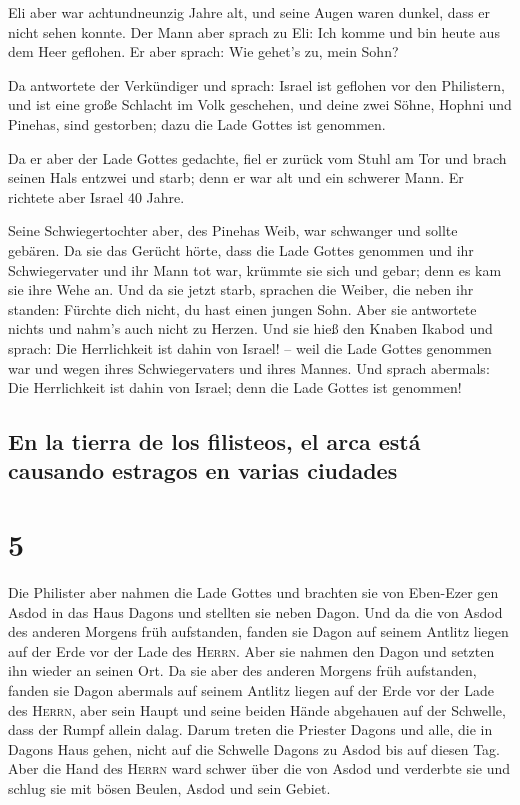  Eli aber war achtundneunzig Jahre alt, und seine Augen
waren dunkel, dass er nicht sehen konnte.  Der Mann aber
sprach zu Eli: Ich komme und bin heute aus dem Heer geflohen. Er aber
sprach: Wie gehet's zu, mein Sohn?

 Da antwortete der Verkündiger und sprach: Israel ist
geflohen vor den Philistern, und ist eine große Schlacht im Volk
geschehen, und deine zwei Söhne, Hophni und Pinehas, sind gestorben;
dazu die Lade Gottes ist genommen.

 Da er aber der Lade Gottes gedachte, fiel er zurück vom
Stuhl am Tor und brach seinen Hals entzwei und starb; denn er war alt
und ein schwerer Mann. Er richtete aber Israel 40 Jahre.

 Seine Schwiegertochter aber, des Pinehas Weib, war
schwanger und sollte gebären. Da sie das Gerücht hörte, dass die Lade
Gottes genommen und ihr Schwiegervater und ihr Mann tot war, krümmte sie
sich und gebar; denn es kam sie ihre Wehe an.  Und da sie
jetzt starb, sprachen die Weiber, die neben ihr standen: Fürchte dich
nicht, du hast einen jungen Sohn. Aber sie antwortete nichts und nahm's
auch nicht zu Herzen.  Und sie hieß den Knaben Ikabod und
sprach: Die Herrlichkeit ist dahin von Israel! -- weil die Lade Gottes
genommen war und wegen ihres Schwiegervaters und ihres Mannes.
 Und sprach abermals: Die Herrlichkeit ist dahin von
Israel; denn die Lade Gottes ist genommen!

\hypertarget{en-la-tierra-de-los-filisteos-el-arca-estuxe1-causando-estragos-en-varias-ciudades}{%
\subsection{En la tierra de los filisteos, el arca está causando
estragos en varias
ciudades}\label{en-la-tierra-de-los-filisteos-el-arca-estuxe1-causando-estragos-en-varias-ciudades}}

\hypertarget{section-4}{%
\section{5}\label{section-4}}

 Die Philister aber nahmen die Lade Gottes und brachten
sie von Eben-Ezer gen Asdod  in das Haus Dagons und
stellten sie neben Dagon.  Und da die von Asdod des
anderen Morgens früh aufstanden, fanden sie Dagon auf seinem Antlitz
liegen auf der Erde vor der Lade des \textsc{Herrn}. Aber sie nahmen den
Dagon und setzten ihn wieder an seinen Ort.  Da sie aber
des anderen Morgens früh aufstanden, fanden sie Dagon abermals auf
seinem Antlitz liegen auf der Erde vor der Lade des \textsc{Herrn}, aber
sein Haupt und seine beiden Hände abgehauen auf der Schwelle, dass der
Rumpf allein dalag.  Darum treten die Priester Dagons und
alle, die in Dagons Haus gehen, nicht auf die Schwelle Dagons zu Asdod
bis auf diesen Tag.  Aber die Hand des \textsc{Herrn} ward
schwer über die von Asdod und verderbte sie und schlug sie mit bösen
Beulen, Asdod und sein Gebiet.

